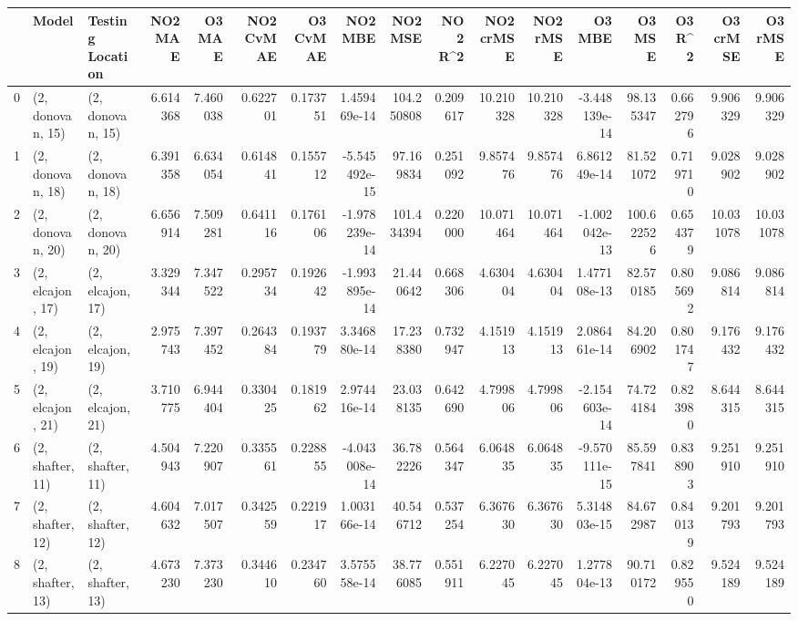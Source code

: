 \begin{tabular}{lllrrrrrrrrrrrrrr}
\toprule
{} &             Model &  Testing Location &   NO2 MAE &    O3 MAE &  NO2 CvMAE &  O3 CvMAE &       NO2 MBE &     NO2 MSE &   NO2 R\textasciicircum2 &  NO2 crMSE &   NO2 rMSE &        O3 MBE &      O3 MSE &    O3 R\textasciicircum2 &   O3 crMSE &    O3 rMSE \\
\midrule
0  &  (2, donovan, 15) &  (2, donovan, 15) &  6.614368 &  7.460038 &   0.622701 &  0.173751 &  1.459469e-14 &  104.250808 &  0.209617 &  10.210328 &  10.210328 & -3.448139e-14 &   98.135347 &  0.662796 &   9.906329 &   9.906329 \\
1  &  (2, donovan, 18) &  (2, donovan, 18) &  6.391358 &  6.634054 &   0.614841 &  0.155712 & -5.545492e-15 &   97.169834 &  0.251092 &   9.857476 &   9.857476 &  6.861249e-14 &   81.521072 &  0.719710 &   9.028902 &   9.028902 \\
2  &  (2, donovan, 20) &  (2, donovan, 20) &  6.656914 &  7.509281 &   0.641116 &  0.176106 & -1.978239e-14 &  101.434394 &  0.220000 &  10.071464 &  10.071464 & -1.002042e-13 &  100.622526 &  0.654379 &  10.031078 &  10.031078 \\
3  &  (2, elcajon, 17) &  (2, elcajon, 17) &  3.329344 &  7.347522 &   0.295734 &  0.192642 & -1.993895e-14 &   21.440642 &  0.668306 &   4.630404 &   4.630404 &  1.477108e-13 &   82.570185 &  0.805692 &   9.086814 &   9.086814 \\
4  &  (2, elcajon, 19) &  (2, elcajon, 19) &  2.975743 &  7.397452 &   0.264384 &  0.193779 &  3.346880e-14 &   17.238380 &  0.732947 &   4.151913 &   4.151913 &  2.086461e-14 &   84.206902 &  0.801747 &   9.176432 &   9.176432 \\
5  &  (2, elcajon, 21) &  (2, elcajon, 21) &  3.710775 &  6.944404 &   0.330425 &  0.181962 &  2.974416e-14 &   23.038135 &  0.642690 &   4.799806 &   4.799806 & -2.154603e-14 &   74.724184 &  0.823980 &   8.644315 &   8.644315 \\
6  &  (2, shafter, 11) &  (2, shafter, 11) &  4.504943 &  7.220907 &   0.335561 &  0.228855 & -4.043008e-14 &   36.782226 &  0.564347 &   6.064835 &   6.064835 & -9.570111e-15 &   85.597841 &  0.838903 &   9.251910 &   9.251910 \\
7  &  (2, shafter, 12) &  (2, shafter, 12) &  4.604632 &  7.017507 &   0.342559 &  0.221917 &  1.003166e-14 &   40.546712 &  0.537254 &   6.367630 &   6.367630 &  5.314803e-15 &   84.672987 &  0.840139 &   9.201793 &   9.201793 \\
8  &  (2, shafter, 13) &  (2, shafter, 13) &  4.673230 &  7.373230 &   0.344610 &  0.234760 &  3.575558e-14 &   38.776085 &  0.551911 &   6.227045 &   6.227045 &  1.277804e-13 &   90.710172 &  0.829550 &   9.524189 &   9.524189 \\

\end{tabular}
